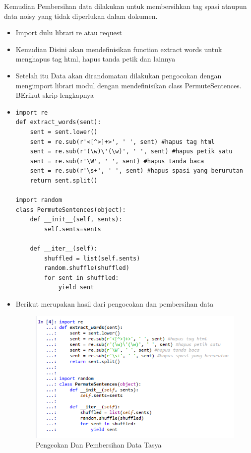 Kemudian Pembersihan data dilakukan untuk membersihkan tag spasi ataupun data noisy yang tidak diperlukan dalam dokumen.
\begin{itemize}
\item Import dulu librari re atau request
\item Kemudian Disini akan mendefinisikan function extract words untuk menghapus tag html, hapus tanda petik dan lainnya
\item Setelah itu Data akan dirandomatau dilakukan pengocokan dengan mengimport librari modul dengan mendefinisikan class PermuteSentences. BErikut skrip lengkapnya
\item \begin{verbatim}
import re
def extract_words(sent):
    sent = sent.lower()
    sent = re.sub(r'<[^>]+>', ' ', sent) #hapus tag html
    sent = re.sub(r'(\w)\'(\w)', ' ', sent) #hapus petik satu
    sent = re.sub(r'\W', ' ', sent) #hapus tanda baca
    sent = re.sub(r'\s+', ' ', sent) #hapus spasi yang berurutan
    return sent.split()

import random
class PermuteSentences(object):
    def __init__(self, sents):
        self.sents=sents
        
    def __iter__(self):
        shuffled = list(self.sents)
        random.shuffle(shuffled)
        for sent in shuffled:
            yield sent
\end{verbatim}
\item Berikut merupakan hasil dari pengocokan dan pembersihan data
\begin{figure}[ht]
\centering
\includegraphics[scale=0.5]{figures/chapter5tasya19.png}
\caption{Pengcokan Dan Pembersihan Data Tasya}
\label{Praktek}
\end{figure}
\end{itemize}



